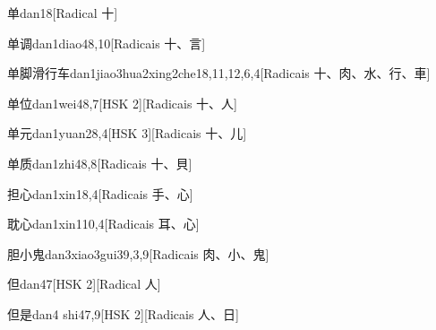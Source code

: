 \begin{entry}{单}{dan1}{8}[Radical ⼗]
\end{entry}

\begin{entry}{单调}{dan1diao4}{8,10}[Radicais ⼗、⾔]
\end{entry}

\begin{entry}{单脚滑行车}{dan1jiao3hua2xing2che1}{8,11,12,6,4}[Radicais ⼗、⾁、⽔、⾏、⾞]
\end{entry}

\begin{entry}{单位}{dan1wei4}{8,7}[HSK 2][Radicais ⼗、⼈]
\end{entry}

\begin{entry}{单元}{dan1yuan2}{8,4}[HSK 3][Radicais ⼗、⼉]
\end{entry}

\begin{entry}{单质}{dan1zhi4}{8,8}[Radicais ⼗、⾙]
\end{entry}

\begin{entry}{担心}{dan1xin1}{8,4}[Radicais ⼿、⼼]
\end{entry}

\begin{entry}{耽心}{dan1xin1}{10,4}[Radicais ⽿、⼼]
\end{entry}

\begin{entry}{胆小鬼}{dan3xiao3gui3}{9,3,9}[Radicais ⾁、⼩、⿁]
\end{entry}

\begin{entry}{但}{dan4}{7}[HSK 2][Radical ⼈]
\end{entry}

\begin{entry}{但是}{dan4 shi4}{7,9}[HSK 2][Radicais ⼈、⽇]
\end{entry}

